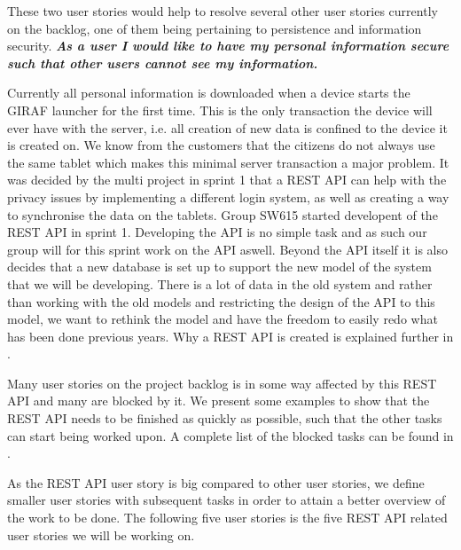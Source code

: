 These two user stories would help to resolve several other user stories currently on the backlog, one of them being pertaining to persistence and information security.
\textbf{\textit{As a user I would like to have my personal information secure such that other users cannot see my information.}}

Currently all personal information is downloaded when a device starts the GIRAF launcher for the first time.
This is the only transaction the device will ever have with the server, i.e. all creation of new data is confined to the device it is created on.
We know from the customers that the citizens do not always use the same tablet which makes this minimal server transaction a major problem.
It was decided by the multi project in sprint 1 that a REST API can help with the privacy issues by implementing a different login system, as well as creating a way to synchronise the data on the tablets.
Group SW615 started developent of the REST API in sprint 1.
Developing the API is no simple task and as such our group will for this sprint work on the API aswell.
Beyond the API itself it is also decides that a new database is set up to support the new model of the system that we will be developing.
There is a lot of data in the old system and rather than working with the old models and restricting the design of the API to this model, we want to rethink the model and have the freedom to easily redo what has been done previous years.
Why a REST API is created is explained further in .

Many user stories on the project backlog is in some way affected by this REST API and many are blocked by it.
We present some examples to show that the REST API needs to be finished as quickly as possible, such that the other tasks can start being worked upon.
A complete list of the blocked tasks can be found in . 

As the REST API user story is big compared to other user stories, we define smaller user stories with subsequent tasks in order to attain a better overview of the work to be done.
The following five user stories is the five REST API related user stories we will be working on.

